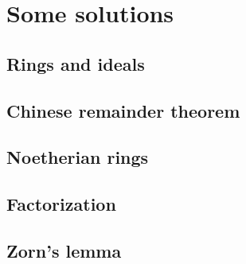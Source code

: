 \chapter{Some solutions}

\section*{Rings and ideals}
\section*{Chinese remainder theorem}
\section*{Noetherian rings}
\section*{Factorization}
\section*{Zorn's lemma}